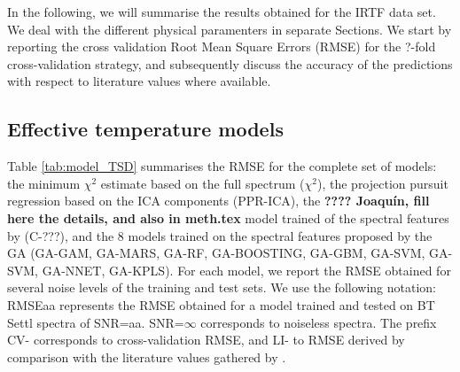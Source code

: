 
In the following, we will summarise the results obtained for the IRTF
data set. We deal with the different physical paramenters in separate
Sections. We start by reporting the cross validation Root Mean Square
Errors (RMSE) for the ?-fold cross-validation strategy, and
subsequently discuss the accuracy of the predictions with respect to
literature values where available.

\subsection{Effective temperature models}

Table \ref{tab:model_TSD} summarises the RMSE for the complete set of
models: the minimum $\chi^2$ estimate based on the full spectrum
($\chi^2$), the projection pursuit regression based on the ICA
components (PPR-ICA), the {\bf ???? Joaquín, fill here the details,
and also in meth.tex} model trained of the spectral features
by \cite{cesetti} (C-???), and the 8 models trained on the spectral
features proposed by the GA (GA-GAM, GA-MARS, GA-RF, GA-BOOSTING,
GA-GBM, GA-SVM, GA-SVM, GA-NNET, GA-KPLS). For each model, we report
the RMSE obtained for several noise levels of the training and test
sets. We use the following notation: RMSEaa represents the RMSE
obtained for a model trained and tested on BT Settl spectra of
SNR=aa. SNR=$\infty$ corresponds to noiseless spectra. The prefix CV-
corresponds to cross-validation RMSE, and LI- to RMSE derived by
comparison with the literature values gathered by \cite{cesetti}.

